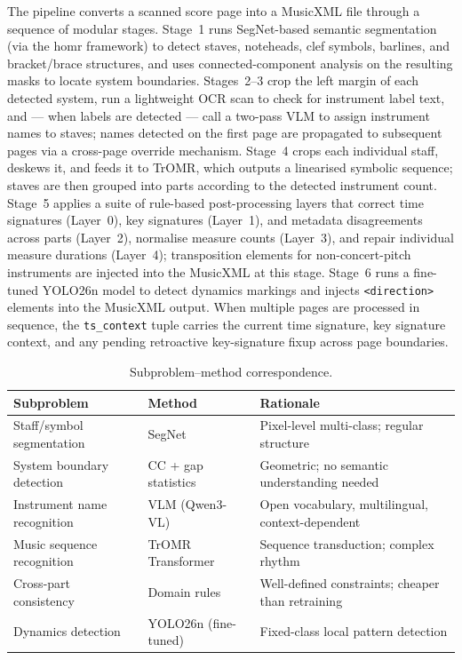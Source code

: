 \documentclass[11pt,a4paper]{article}
\begin{document}
The pipeline converts a scanned score page into a MusicXML file through a sequence of modular stages.
Stage~1 runs SegNet-based semantic segmentation (via the homr framework) to detect staves, noteheads, clef symbols, barlines, and bracket/brace structures, and uses connected-component analysis on the resulting masks to locate system boundaries.
Stages~2--3 crop the left margin of each detected system, run a lightweight OCR scan to check for instrument label text, and --- when labels are detected --- call a two-pass VLM to assign instrument names to staves; names detected on the first page are propagated to subsequent pages via a cross-page override mechanism.
Stage~4 crops each individual staff, deskews it, and feeds it to TrOMR, which outputs a linearised symbolic sequence; staves are then grouped into parts according to the detected instrument count.
Stage~5 applies a suite of rule-based post-processing layers that correct time signatures (Layer~0), key signatures (Layer~1), and metadata disagreements across parts (Layer~2), normalise measure counts (Layer~3), and repair individual measure durations (Layer~4); transposition elements for non-concert-pitch instruments are injected into the MusicXML at this stage.
Stage~6 runs a fine-tuned YOLO26n model to detect dynamics markings and injects \texttt{<direction>} elements into the MusicXML output.
When multiple pages are processed in sequence, the \texttt{ts\_context} tuple carries the current time signature, key signature context, and any pending retroactive key-signature fixup across page boundaries.

\begin{table}[h]
\centering
\begin{tabular}{@{}p{3.8cm}p{3.8cm}p{5cm}@{}}
\toprule
\textbf{Subproblem} & \textbf{Method} & \textbf{Rationale} \\
\midrule
Staff/symbol segmentation & SegNet & Pixel-level multi-class; regular structure \\
System boundary detection & CC + gap statistics & Geometric; no semantic understanding needed \\
Instrument name recognition & VLM (Qwen3-VL) & Open vocabulary, multilingual, context-dependent \\
Music sequence recognition & TrOMR Transformer & Sequence transduction; complex rhythm \\
Cross-part consistency    & Domain rules  & Well-defined constraints; cheaper than retraining \\
Dynamics detection        & YOLO26n (fine-tuned) & Fixed-class local pattern detection \\
\bottomrule
\end{tabular}
\caption{Subproblem--method correspondence.}
\end{table}
\end{document}
